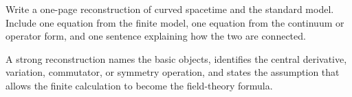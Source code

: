\begin{exercise}
Write a one-page reconstruction of curved spacetime and the standard model.  Include one equation from the finite model, one equation from the continuum or operator form, and one sentence explaining how the two are connected.
\begin{answer}
A strong reconstruction names the basic objects, identifies the central derivative, variation, commutator, or symmetry operation, and states the assumption that allows the finite calculation to become the field-theory formula.
\end{answer}
\end{exercise}
